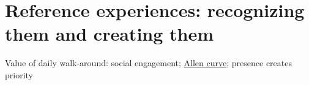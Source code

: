 \section{Reference experiences: recognizing them and creating them}

Value of daily walk-around: 
social engagement; 
\href{https://en.wikipedia.org/wiki/Allen_curve}{Allen curve}; 
presence creates priority